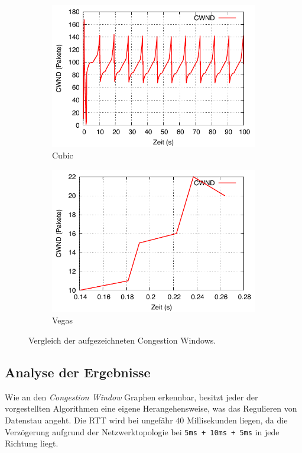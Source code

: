 \documentclass[paper=a4,fontsize=12pt,ngerman]{scrartcl}
\begin{document}
\begin{figure}[H]
\begin{subfigure}{0.40\textwidth}
        \includegraphics[width=\linewidth]{graphics/cubicCW.pdf}
        \caption{Cubic}
        \label{fig:cubic}
    \end{subfigure}
    \hfill
    \begin{subfigure}{0.40\textwidth}
        \includegraphics[width=\linewidth]{graphics/vegasCW.pdf}
        \caption{Vegas}
        \label{fig:vegas}
    \end{subfigure}

    \caption{Vergleich der aufgezeichneten Congestion Windows.}
    \label{fig:cwnd-all}
\end{figure}

\clearpage 
\subsection{Analyse der Ergebnisse}
Wie an den \textit{Congestion Window} Graphen erkennbar, besitzt jeder 
der vorgestellten Algorithmen eine eigene Herangehensweise, was das Regulieren 
von Datenstau angeht.
Die RTT wird bei ungefähr $40$ Millisekunden liegen, da die Verzögerung aufgrund
der Netzwerktopologie bei \texttt{5ms + 10ms + 5ms} in jede Richtung liegt. 
\end{document}
